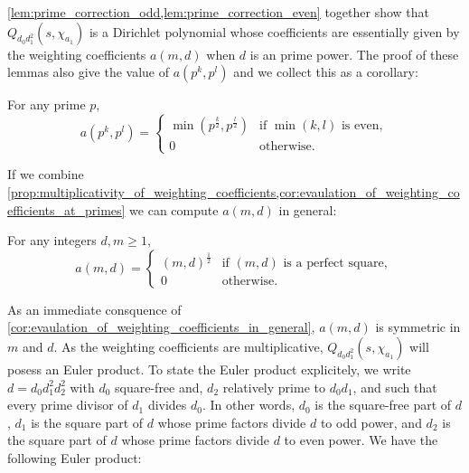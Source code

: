 \documentclass[12pt,reqno,oneside]{amsart}
\begin{document}
    \cref{lem:prime_correction_odd,lem:prime_correction_even} together show that $Q_{d_{0}d_{1}^{2}}(s,\chi_{a_{1}})$ is a Dirichlet polynomial whose coefficients are essentially given by the weighting coefficients $a(m,d)$ when $d$ is an prime power. The proof of these lemmas also give the value of $a(p^{k},p^{l})$ and we collect this as a corollary:

    \begin{corollary}\label{cor:evaulation_of_weighting_coefficients_at_primes}
        For any prime $p$,
        \[
            a(p^{k},p^{l}) = \begin{cases} \min\left(p^{\frac{k}{2}},p^{\frac{l}{2}}\right) & \text{if $\min(k,l)$ is even}, \\ 0 & \text{otherwise}. \end{cases}
        \]
    \end{corollary}

    If we combine \cref{prop:multiplicativity_of_weighting_coefficients,cor:evaulation_of_weighting_coefficients_at_primes} we can compute $a(m,d)$ in general:

    \begin{corollary}\label{cor:evaulation_of_weighting_coefficients_in_general}
        For any integers $d,m \ge 1$,
        \[
            a(m,d) = \begin{cases} (m,d)^{\frac{1}{2}} & \text{if $(m,d)$ is a perfect square}, \\ 0 & \text{otherwise}. \end{cases}
         \]
    \end{corollary}
    
    As an immediate consquence of \cref{cor:evaulation_of_weighting_coefficients_in_general}, $a(m,d)$ is symmetric in $m$ and $d$. As the weighting coefficients are multiplicative, $Q_{d_{0}d_{1}^{2}}(s,\chi_{a_{1}})$ will posess an Euler product. To state the Euler product explicitely, we write $d = d_{0}d_{1}^{2}d_{2}^{2}$ with $d_{0}$ square-free and, $d_{2}$ relatively prime to $d_{0}d_{1}$, and such that every prime divisor of $d_{1}$ divides $d_{0}$. In other words, $d_{0}$ is the square-free part of $d$, $d_{1}$ is the square part of $d$ whose prime factors divide $d$ to odd power, and $d_{2}$ is the square part of $d$ whose prime factors divide $d$ to even power. We have the following Euler product:
\end{document}
